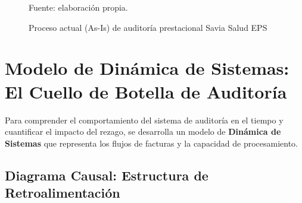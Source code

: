 \documentclass[12pt,letterpaper]{report}
\newcommand{\fuentepropia}{%
  \vspace{-0.4em}%
  {\footnotesize Fuente: elaboración propia.}%
}
\begin{document}
\begin{figure}[H]
{
}
\caption{Proceso actual (As-Is) de auditoría prestacional Savia Salud EPS}
\label{fig:proceso_actual}
\fuentepropia
\end{figure}

\section{Modelo de Dinámica de Sistemas: El Cuello de Botella de Auditoría}

Para comprender el comportamiento del sistema de auditoría en el tiempo y cuantificar el impacto del rezago, se desarrolla un modelo de \textbf{Dinámica de Sistemas} que representa los flujos de facturas y la capacidad de procesamiento.

\subsection{Diagrama Causal: Estructura de Retroalimentación}
\end{document}
